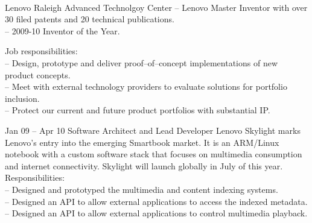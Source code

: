 \documentclass[letterpaper, 11pt]{article}
\begin{document}
    \begin{resume}
        \\[2ex]
        \begin{block}
            \begin{category}{Lenovo}
                 {Raleigh Advanced Technolgoy Center}
                -- Lenovo Master Inventor with over 30 filed patents and 20 technical publications. \\
                -- 2009-10 Inventor of the Year. \\
                \par
                Job responsibilities: \\
                -- Design, prototype and deliver proof--of--concept implementations of new product concepts. \\
                -- Meet with external technology providers to evaluate solutions for portfolio inclusion. \\
                -- Protect our current and future product portfolios with substantial IP.
                \bigskip
            \end{category}
            \begin{subcategory}{Jan 09 -- Apr 10}
                 {Software Architect and Lead Developer}
                Lenovo Skylight marks Lenovo's entry into the emerging Smartbook market.
                It is an ARM/Linux notebook with a custom software stack that focuses
                on multimedia consumption and internet connectivity.
                Skylight will launch globally in July of this year.
                \\[1ex]
                Responsibilities: \\
                -- Designed and prototyped the multimedia and content indexing systems. \\
                -- Designed an API to allow external applications to access the indexed metadata. \\
                -- Designed an API to allow external applications to control multimedia playback. \\

\end{subcategory}
\end{block}
\end{resume}
\end{document}
